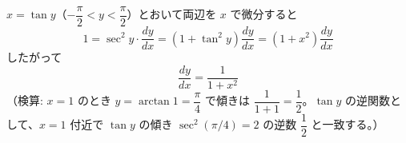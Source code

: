 
$x = \tan y$（$-\dfrac{\pi}{2} < y < \dfrac{\pi}{2}$）とおいて両辺を $x$ で微分すると
\[
1 = \sec^{2} y \cdot \frac{dy}{dx} = (1+\tan^{2}y)\frac{dy}{dx} = (1+x^{2})\frac{dy}{dx}
\]
したがって
\[
\boxed{\; \frac{dy}{dx} = \frac{1}{1+x^{2}} \;}
\]
（検算: $x=1$ のとき $y = \arctan 1 = \dfrac{\pi}{4}$ で傾きは $\dfrac{1}{1+1}=\dfrac{1}{2}$。$\tan y$ の逆関数として、$x=1$ 付近で $\tan y$ の傾き $\sec^{2}(\pi/4)=2$ の逆数 $\dfrac12$ と一致する。）

